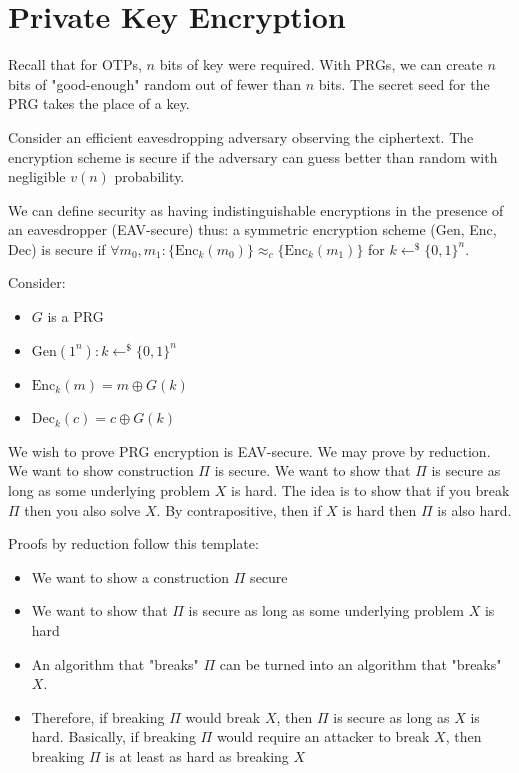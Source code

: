 \section{Private Key Encryption}

Recall that for OTPs, $n$ bits of key were required. 
With PRGs, we can create $n$ bits of "good-enough" 
random out of fewer than $n$ bits. The secret seed 
for the PRG takes the place of a key. 

Consider an efficient eavesdropping adversary observing 
the ciphertext. The encryption scheme is secure if the 
adversary can guess better than random with negligible $v(n)$
probability. 

We can define security as having indistinguishable 
encryptions in the presence of an eavesdropper 
(EAV-secure) thus: a symmetric encryption scheme
(Gen, Enc, Dec) is secure if 
$\forall m_0, m_1:\{\text{Enc}_k(m_0)\} \approx_c \{\text{Enc}_k(m_1)\}$
for $k \leftarrow^\mathdollar \{0,1\}^n$. 

Consider: 
\begin{itemize}
    \item $G$ is a PRG
    \item $\text{Gen}(1^n): k\leftarrow^\mathdollar \{0,1\}^n$
    \item $\text{Enc}_k(m) = m \oplus G(k)$
    \item $\text{Dec}_k(c) = c \oplus G(k)$
\end{itemize}
We wish to prove PRG encryption is EAV-secure. 
We may prove by reduction. We want to show 
construction $\Pi$ is secure. We want to show 
that $\Pi$ is secure as long as some underlying 
problem $X$ is hard. The idea is to show that if 
you break $\Pi$ then you also solve $X$. By 
contrapositive, then if $X$ is hard then $\Pi$ 
is also hard. 

Proofs by reduction follow this template:
\begin{itemize}
    \item We want to show a construction $\Pi$ secure 
    \item We want to show that $\Pi$ is secure as long as some underlying problem $X$ is hard
    \item An algorithm that "breaks" $\Pi$ can be turned 
            into an algorithm that "breaks" $X$. 
    \item Therefore, if breaking $\Pi$ would break 
    $X$, then $\Pi$ is secure as long as $X$ is hard. 
    Basically, if breaking $\Pi$ would require an 
    attacker to break $X$, then breaking $\Pi$ is at 
    least as hard as breaking $X$
\end{itemize}

